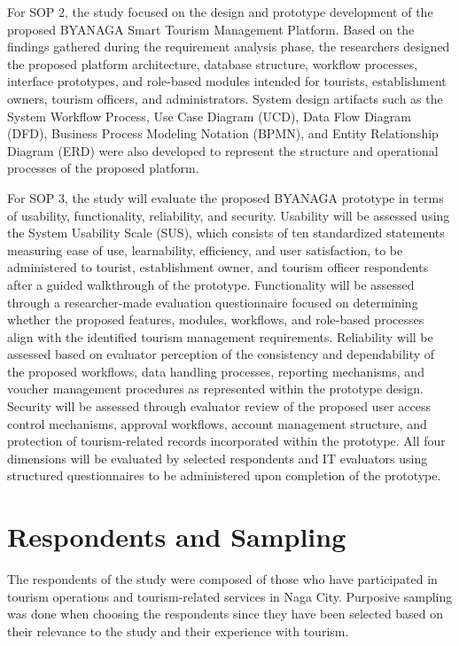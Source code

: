 \documentclass{research}
\begin{document}
For SOP 2, the study focused on the design and prototype development of the 
proposed BYANAGA Smart Tourism Management Platform. Based on the findings 
gathered during the requirement analysis phase, the researchers designed the 
proposed platform architecture, database structure, workflow processes, 
interface prototypes, and role-based modules intended for tourists, 
establishment owners, tourism officers, and administrators. System design 
artifacts such as the System Workflow Process, Use Case Diagram (UCD), Data Flow Diagram (DFD), 
Business Process Modeling Notation (BPMN), and Entity Relationship Diagram 
(ERD) were also developed to represent the structure and operational 
processes of the proposed platform.

For SOP 3, the study will evaluate the proposed BYANAGA prototype in terms 
of usability, functionality, reliability, and security. Usability will be 
assessed using the System Usability Scale (SUS), which consists of ten 
standardized statements measuring ease of use, learnability, efficiency, and 
user satisfaction, to be administered to tourist, establishment owner, and 
tourism officer respondents after a guided walkthrough of the prototype. 
Functionality will be assessed through a researcher-made evaluation 
questionnaire focused on determining whether the proposed features, modules, 
workflows, and role-based processes align with the identified tourism 
management requirements. Reliability will be assessed based on evaluator 
perception of the consistency and dependability of the proposed workflows, 
data handling processes, reporting mechanisms, and voucher management 
procedures as represented within the prototype design. Security will be 
assessed through evaluator review of the proposed user access control 
mechanisms, approval workflows, account management structure, and protection 
of tourism-related records incorporated within the prototype. All four 
dimensions will be evaluated by selected respondents and IT evaluators using 
structured questionnaires to be administered upon completion of the 
prototype.

\section{Respondents and Sampling}

The respondents of the study were composed of those who have participated in tourism operations and tourism-related services in Naga City. Purposive sampling was done when choosing the respondents since they have been selected based on their relevance to the study and their experience with tourism.
\end{document}

